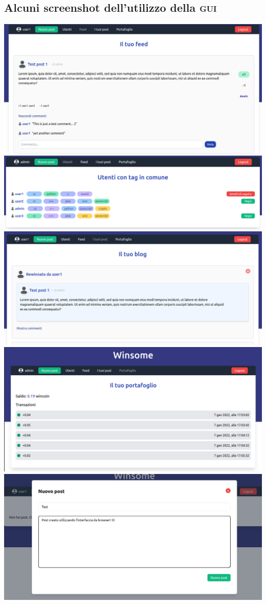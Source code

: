 \documentclass[a4paper,8pt]{article} %
\begin{document}
\subsection{Alcuni screenshot dell'utilizzo della \textsc{gui}}
\includegraphics[width=\textwidth]{feed.png}\vspace*{0.5cm}
\includegraphics[width=\textwidth]{users.png}\vspace*{0.5cm}
\includegraphics[width=\textwidth]{rewin.png}\vspace*{0.5cm}\newpage
\includegraphics[width=\textwidth]{wallet.png}\vspace*{0.5cm}
\includegraphics[width=\textwidth]{newpost.png}
\end{document}
